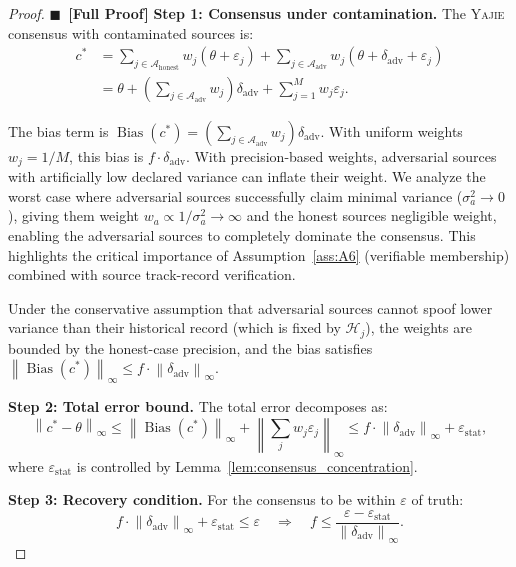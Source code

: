 \documentclass[11pt,a4paper]{article}
\theoremstyle{definition}
\newcommand{\rigorFull}[0]{$\blacksquare$~\textbf{[Full Proof]}}
\newcommand{\Yajie}{\textsc{Yajie}}
\DeclareMathOperator{\Bias}{Bias}
\newcommand{\norm}[1]{\left\lVert#1\right\rVert}
\newcommand{\cA}{\mathcal{A}}
\begin{document}
\begin{proof}\rigorFull
\textbf{Step 1: Consensus under contamination.} The \Yajie{} consensus with contaminated sources is:
\begin{align}
    c^* &= \sum_{j \in \cA_{\mathrm{honest}}} w_j (\theta + \varepsilon_j) + \sum_{j \in \cA_{\mathrm{adv}}} w_j (\theta + \delta_{\mathrm{adv}} + \varepsilon_j) \\
        &= \theta + \left(\sum_{j \in \cA_{\mathrm{adv}}} w_j\right) \delta_{\mathrm{adv}} + \sum_{j=1}^{M} w_j \varepsilon_j.
    \label{eq:contaminated_consensus}
\end{align}

The bias term is $\Bias(c^*) = (\sum_{j \in \cA_{\mathrm{adv}}} w_j) \delta_{\mathrm{adv}}$. With uniform weights $w_j = 1/M$, this bias is $f \cdot \delta_{\mathrm{adv}}$. With precision-based weights, adversarial sources with artificially low declared variance can inflate their weight. We analyze the worst case where adversarial sources successfully claim minimal variance ($\sigma_a^2 \to 0$), giving them weight $w_a \propto 1/\sigma_a^2 \to \infty$ and the honest sources negligible weight, enabling the adversarial sources to completely dominate the consensus. This highlights the critical importance of Assumption~\ref{ass:A6} (verifiable membership) combined with source track-record verification.

Under the conservative assumption that adversarial sources cannot spoof lower variance than their historical record (which is fixed by $\mathcal{H}_j$), the weights are bounded by the honest-case precision, and the bias satisfies $\norm{\Bias(c^*)}_\infty \leq f \cdot \norm{\delta_{\mathrm{adv}}}_\infty$.

\textbf{Step 2: Total error bound.} The total error decomposes as:
\begin{equation}
    \norm{c^* - \theta}_\infty \leq \norm{\Bias(c^*)}_\infty + \norm{\sum_j w_j \varepsilon_j}_\infty \leq f \cdot \norm{\delta_{\mathrm{adv}}}_\infty + \varepsilon_{\mathrm{stat}},
    \label{eq:total_error}
\end{equation}
where $\varepsilon_{\mathrm{stat}}$ is controlled by Lemma~\ref{lem:consensus_concentration}.

\textbf{Step 3: Recovery condition.} For the consensus to be within $\varepsilon$ of truth:
\begin{equation}
    f \cdot \norm{\delta_{\mathrm{adv}}}_\infty + \varepsilon_{\mathrm{stat}} \leq \varepsilon \quad\Longrightarrow\quad f \leq \frac{\varepsilon - \varepsilon_{\mathrm{stat}}}{\norm{\delta_{\mathrm{adv}}}_\infty}.
    \label{eq:recovery_condition}
\end{equation}


\end{proof}
\end{document}

